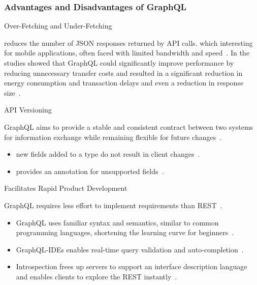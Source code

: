 \begin{frame}\frametitle{Advantages and Disadvantages of GraphQL}

\footnotesize

\begin{block}{Over-Fetching and Under-Fetching}

reduces the number of JSON responses returned by API calls. which interesting for mobile applications, often faced with limited bandwidth and speed~\cite{migrating-to-gql,gql-healthcare}. In the studies showed that GraphQL could significantly improve performance by reducing unnecessary transfer costs and resulted in a significant reduction in energy consumption and transaction delays and even a reduction in response size~\cite{migrating-to-gql,real-time-sys-arc-based-on-gql,gql-iot}.
\end{block}

\begin{block}{API Versioning}

GraphQL aims to provide a stable and consistent contract between two systems for information exchange while remaining flexible for future changes~\cite{gql-healthcare}. 

\begin{itemize}
  \item new fields added to a type do not result in client changes~\cite{migrating-to-gql}. 
  \item provides an  annotation for unsupported fields~\cite{migrating-to-gql}. 
\end{itemize}

\end{block}

\begin{block}{Facilitates Rapid Product Development}

GraphQL requires less effort to implement requirements than REST~\cite{rest-vs-gql-controlled-experiment}.

\begin{itemize}
  \item  GraphQL uses familiar syntax and semantics, similar to common programming languages, shortening the learning curve for beginners~\cite{rest-vs-gql-controlled-experiment}.
  \item GraphQL-IDEs enables real-time query validation and auto-completion~\cite{rest-vs-gql-controlled-experiment,migrating-to-gql}.
  \item Introspection frees up servers to support an interface description language and enables clients to explore the REST instantly~\cite{migrating-to-gql}. 
\end{itemize}

\end{block}


\end{frame}

